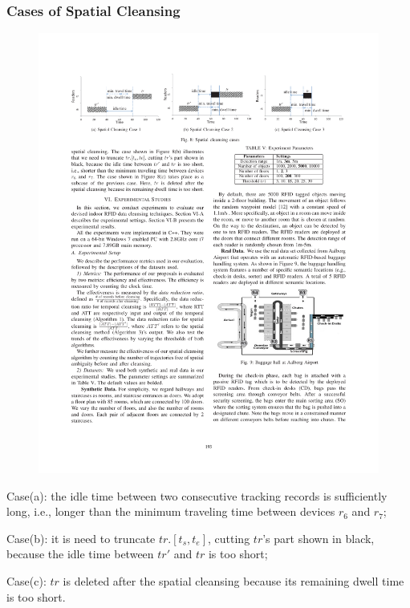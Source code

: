 \begin{frame}
\frametitle{Cases of Spatial Cleansing}

\begin{figure}[tb]
  \includegraphics[width=\columnwidth]{figures/3-2/3-2-12.pdf}
\end{figure}

\begin{sitemize}
  \item Case(a): the idle time between two consecutive tracking records is sufficiently long, i.e., longer than the minimum traveling time between devices $r_6$ and $r_7$;
  \item Case(b): it is need to truncate $tr.[t_s, t_e]$, cutting $tr$'s part shown in black, because the idle time between $tr'$ and $tr$ is too short;
  \item Case(c): $tr$ is deleted after the spatial cleansing because its remaining dwell time is too short.
\end{sitemize}

\end{frame}

